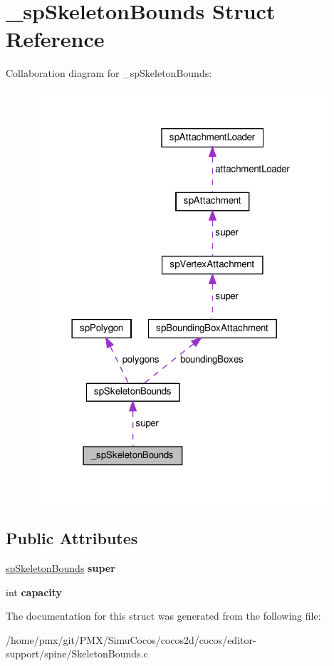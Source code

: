 \hypertarget{struct__spSkeletonBounds}{}\section{\+\_\+sp\+Skeleton\+Bounds Struct Reference}
\label{struct__spSkeletonBounds}


Collaboration diagram for \+\_\+sp\+Skeleton\+Bounds\+:
\nopagebreak
\begin{figure}[H]
\begin{center}
\leavevmode
\includegraphics[width=310pt]{struct__spSkeletonBounds__coll__graph}
\end{center}
\end{figure}
\subsection*{Public Attributes}
\begin{DoxyCompactItemize}
\item 
\mbox{\label{struct__spSkeletonBounds_a3083b3d45a521511e6946da3a49168a4}} 
\hyperlink{structspSkeletonBounds}{sp\+Skeleton\+Bounds} {\bfseries super}
\item 
\mbox{\label{struct__spSkeletonBounds_a69d3768b2d04159ad07051a58c903ccf}} 
int {\bfseries capacity}
\end{DoxyCompactItemize}


The documentation for this struct was generated from the following file\+:\begin{DoxyCompactItemize}
\item 
/home/pmx/git/\+P\+M\+X/\+Simu\+Cocos/cocos2d/cocos/editor-\/support/spine/Skeleton\+Bounds.\+c\end{DoxyCompactItemize}
